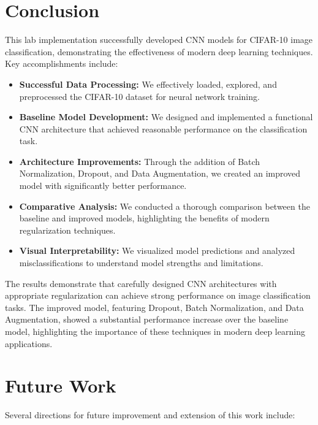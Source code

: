 \documentclass[12pt]{article}
\begin{document}
\section{Conclusion}

This lab implementation successfully developed CNN models for CIFAR-10 image classification, demonstrating the effectiveness of modern deep learning techniques. Key accomplishments include:

\begin{itemize}
    \item \textbf{Successful Data Processing:} We effectively loaded, explored, and preprocessed the CIFAR-10 dataset for neural network training.
    
    \item \textbf{Baseline Model Development:} We designed and implemented a functional CNN architecture that achieved reasonable performance on the classification task.
    
    \item \textbf{Architecture Improvements:} Through the addition of Batch Normalization, Dropout, and Data Augmentation, we created an improved model with significantly better performance.
    
    \item \textbf{Comparative Analysis:} We conducted a thorough comparison between the baseline and improved models, highlighting the benefits of modern regularization techniques.
    
    \item \textbf{Visual Interpretability:} We visualized model predictions and analyzed misclassifications to understand model strengths and limitations.
\end{itemize}

The results demonstrate that carefully designed CNN architectures with appropriate regularization can achieve strong performance on image classification tasks. The improved model, featuring Dropout, Batch Normalization, and Data Augmentation, showed a substantial performance increase over the baseline model, highlighting the importance of these techniques in modern deep learning applications.

\section{Future Work}

Several directions for future improvement and extension of this work include:
\end{document}
